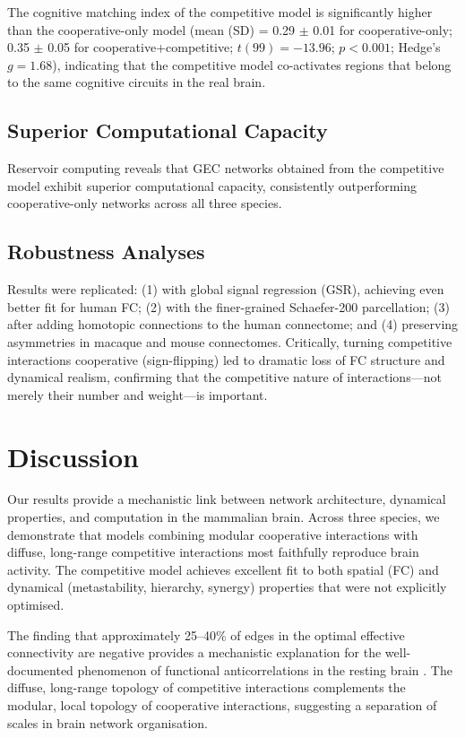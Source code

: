 \documentclass{article}
\begin{document}
The cognitive matching index of the competitive model is significantly higher than the cooperative-only model (mean (SD) = 0.29 $\pm$ 0.01 for cooperative-only; 0.35 $\pm$ 0.05 for cooperative+competitive; $t(99) = -13.96$; $p < 0.001$; Hedge's $g = 1.68$), indicating that the competitive model co-activates regions that belong to the same cognitive circuits in the real brain.

\subsection{Superior Computational Capacity}

Reservoir computing reveals that GEC networks obtained from the competitive model exhibit superior computational capacity, consistently outperforming cooperative-only networks across all three species.

\subsection{Robustness Analyses}

Results were replicated: (1) with global signal regression (GSR), achieving even better fit for human FC; (2) with the finer-grained Schaefer-200 parcellation; (3) after adding homotopic connections to the human connectome; and (4) preserving asymmetries in macaque and mouse connectomes. Critically, turning competitive interactions cooperative (sign-flipping) led to dramatic loss of FC structure and dynamical realism, confirming that the competitive nature of interactions---not merely their number and weight---is important.

\section{Discussion}

Our results provide a mechanistic link between network architecture, dynamical properties, and computation in the mammalian brain. Across three species, we demonstrate that models combining modular cooperative interactions with diffuse, long-range competitive interactions most faithfully reproduce brain activity. The competitive model achieves excellent fit to both spatial (FC) and dynamical (metastability, hierarchy, synergy) properties that were not explicitly optimised.

The finding that approximately 25--40\% of edges in the optimal effective connectivity are negative provides a mechanistic explanation for the well-documented phenomenon of functional anticorrelations in the resting brain \citep{fox2005human}. The diffuse, long-range topology of competitive interactions complements the modular, local topology of cooperative interactions, suggesting a separation of scales in brain network organisation.
\end{document}

